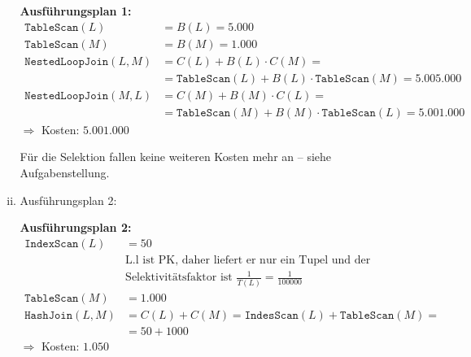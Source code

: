 \begin{enumerate}[a)]
\begin{enumerate}[i)]
\begin{solution}
	\textbf{Ausführungsplan 1:}
	\begin{align*}
		\mathtt{TableScan}(L)         & = B(L) = 5.000                                                         \\
		\mathtt{TableScan}(M)         & = B(M) = 1.000                                                         \\
		\mathtt{NestedLoopJoin}(L, M) & = C(L) + B(L) \cdot C(M) =                                             \\
		                              & =\mathtt{TableScan}(L)+ B(L) \cdot \mathtt{TableScan}(M) =  5.005.000  \\
		\mathtt{NestedLoopJoin}(M, L) & = C(M) + B(M) \cdot C(L) =                                             \\
		                              & = \mathtt{TableScan}(M) + B(M) \cdot \mathtt{TableScan}(L) = 5.001.000
	\end{align*}
	$\Rightarrow$ Kosten: $5.001.000$ \\
	\end{solution}

	\begin{note}
	Für die Selektion fallen keine weiteren Kosten mehr an -- siehe Aufgabenstellung.
	\end{note}

\item
Ausführungsplan 2:


	\begin{solution}
	\textbf{Ausführungsplan 2:}
	\begin{align*}
		\mathtt{IndexScan}(L)  & = 50                                                                 \\
		                       & \text{L.l ist PK, daher liefert er nur ein Tupel und der}           \\
		                       & \text{Selektivitätsfaktor ist $\frac{1}{T(L)} = \frac{1}{100000}$} \\
		\mathtt{TableScan}(M)  & = 1.000                                                              \\
		\mathtt{HashJoin}(L,M) & = C(L) + C(M) = \mathtt{IndesScan}(L) + \mathtt{TableScan}(M) =      \\
		                       & =  50 + 1000
	\end{align*}
	$\Rightarrow$ Kosten: $1.050$


\end{solution}
\end{enumerate}
\end{enumerate}
